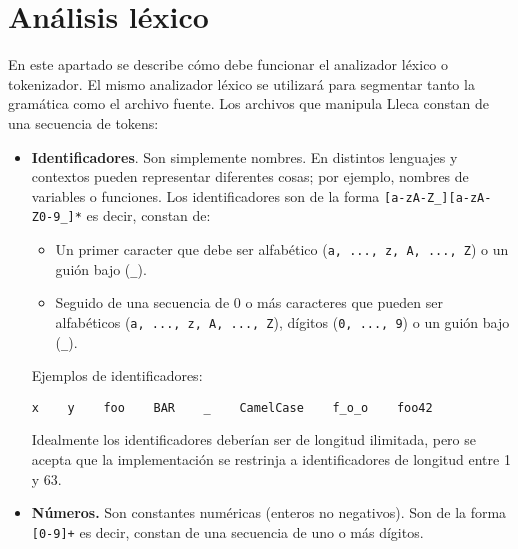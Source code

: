 \documentclass{article}
\newcommand{\lleca}{\textsf{Lleca}\xspace}
\begin{document}
\section{An\'alisis l\'exico}

En este apartado se describe c\'omo debe funcionar el analizador l\'exico
o tokenizador.
El mismo analizador l\'exico se utilizar\'a para segmentar tanto la
gram\'atica como el archivo fuente.
Los archivos que manipula \lleca constan de una secuencia de tokens:

\begin{itemize}
\item {\bf Identificadores}.
      Son simplemente nombres. En distintos lenguajes y contextos
      pueden representar diferentes cosas;
      por ejemplo, nombres de variables o funciones.
      Los identificadores son de la forma \texttt{[a-zA-Z\_][a-zA-Z0-9\_]*}
      es decir, constan de:
      \begin{itemize}
      \item Un primer caracter que debe ser alfab\'etico (\texttt{a, ..., z, A, ..., Z}) o un gui\'on bajo (\verb|_|).
      \item Seguido de una secuencia de $0$ o m\'as caracteres que pueden ser
            alfab\'eticos (\texttt{a, ..., z, A, ..., Z}), d\'igitos (\texttt{0, ..., 9}) o un gui\'on bajo (\verb|_|).
      \end{itemize}
      Ejemplos de identificadores:
      \begin{center}
      \verb|x    y    foo    BAR    _    CamelCase    f_o_o    foo42|
      \end{center}
      Idealmente los identificadores deber\'ian ser de longitud ilimitada, pero se acepta que la implementaci\'on
      se restrinja a identificadores de longitud entre 1 y 63.
\item {\bf N\'umeros.}
      Son constantes num\'ericas (enteros no negativos).
      Son de la forma \texttt{[0-9]+} es decir, constan de una secuencia
      de uno o m\'as d\'igitos.


\end{itemize}
\end{document}
